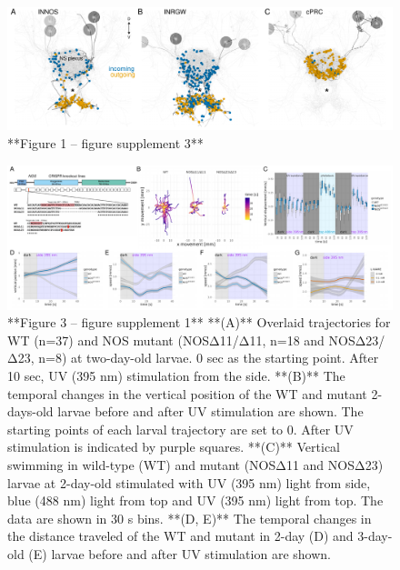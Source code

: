 \documentclass[
  10pt,
  onecolumn]{article}
\begin{document}
\begin{figure}
\includegraphics[width=34.72in]{figures/Fig1_sup3} \caption{**Figure 1 -- figure supplement 3** }\label{fig:unnamed-chunk-10}
\end{figure}

\begin{figure}
\includegraphics[width=44.44in]{figures/Fig3_sup1} \caption{**Figure 3 -- figure supplement 1** **(A)** Overlaid trajectories for WT (n=37) and NOS mutant (NOSΔ11/Δ11, n=18 and NOSΔ23/Δ23, n=8) at two-day-old larvae. 0 sec as the starting point. After 10 sec, UV (395 nm) stimulation from the side. **(B)** The temporal changes in the vertical position of the WT and mutant 2-days-old larvae before and after UV stimulation are shown. The starting points of each larval trajectory are set to 0. After UV stimulation is indicated by purple squares. **(C)** Vertical swimming in wild-type (WT) and mutant (NOSΔ11 and NOSΔ23) larvae at 2-day-old stimulated with UV (395 nm) light from side, blue (488 nm) light from top and UV (395 nm) light from top. The data are shown in 30 s bins. **(D, E)** The temporal changes in the distance traveled of the WT and mutant in 2-day (D) and 3-day-old (E) larvae before and after UV stimulation are shown.}\label{fig:unnamed-chunk-11}
\end{figure}
\end{document}
